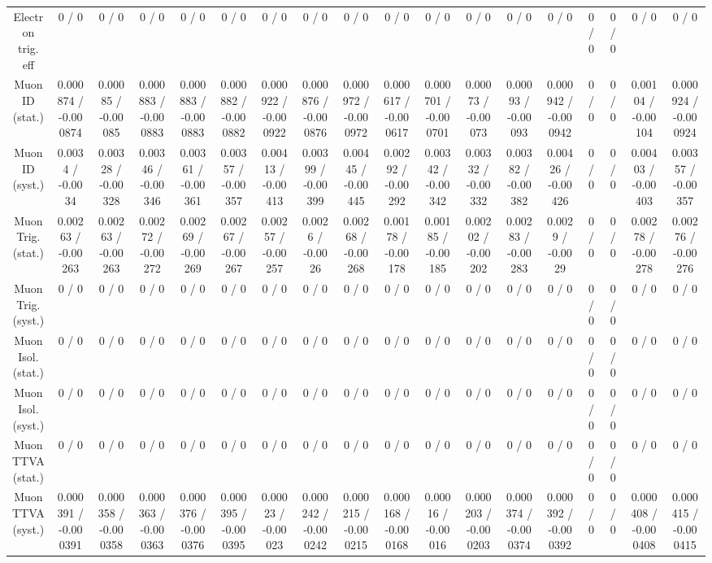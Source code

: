 \documentclass[10pt]{article}
\begin{document}
\begin{table}[htbp]
\begin{center}
\begin{tabular}{|c|c|c|c|c|c|c|c|c|c|c|c|c|c|c|c|c|c|}
  Electron trig. eff & 0 / 0 & 0 / 0 & 0 / 0 & 0 / 0 & 0 / 0 & 0 / 0 & 0 / 0 & 0 / 0 & 0 / 0 & 0 / 0 & 0 / 0 & 0 / 0 & 0 / 0 & 0 / 0 & 0 / 0 & 0 / 0 & 0 / 0 \\ 
  Muon ID (stat.) & 0.000874 / -0.000874 & 0.00085 / -0.00085 & 0.000883 / -0.000883 & 0.000883 / -0.000883 & 0.000882 / -0.000882 & 0.000922 / -0.000922 & 0.000876 / -0.000876 & 0.000972 / -0.000972 & 0.000617 / -0.000617 & 0.000701 / -0.000701 & 0.00073 / -0.00073 & 0.00093 / -0.00093 & 0.000942 / -0.000942 & 0 / 0 & 0 / 0 & 0.00104 / -0.00104 & 0.000924 / -0.000924 \\ 
  Muon ID (syst.) & 0.0034 / -0.0034 & 0.00328 / -0.00328 & 0.00346 / -0.00346 & 0.00361 / -0.00361 & 0.00357 / -0.00357 & 0.00413 / -0.00413 & 0.00399 / -0.00399 & 0.00445 / -0.00445 & 0.00292 / -0.00292 & 0.00342 / -0.00342 & 0.00332 / -0.00332 & 0.00382 / -0.00382 & 0.00426 / -0.00426 & 0 / 0 & 0 / 0 & 0.00403 / -0.00403 & 0.00357 / -0.00357 \\ 
  Muon Trig. (stat.) & 0.00263 / -0.00263 & 0.00263 / -0.00263 & 0.00272 / -0.00272 & 0.00269 / -0.00269 & 0.00267 / -0.00267 & 0.00257 / -0.00257 & 0.0026 / -0.0026 & 0.00268 / -0.00268 & 0.00178 / -0.00178 & 0.00185 / -0.00185 & 0.00202 / -0.00202 & 0.00283 / -0.00283 & 0.0029 / -0.0029 & 0 / 0 & 0 / 0 & 0.00278 / -0.00278 & 0.00276 / -0.00276 \\ 
  Muon Trig. (syst.) & 0 / 0 & 0 / 0 & 0 / 0 & 0 / 0 & 0 / 0 & 0 / 0 & 0 / 0 & 0 / 0 & 0 / 0 & 0 / 0 & 0 / 0 & 0 / 0 & 0 / 0 & 0 / 0 & 0 / 0 & 0 / 0 & 0 / 0 \\ 
  Muon Isol. (stat.) & 0 / 0 & 0 / 0 & 0 / 0 & 0 / 0 & 0 / 0 & 0 / 0 & 0 / 0 & 0 / 0 & 0 / 0 & 0 / 0 & 0 / 0 & 0 / 0 & 0 / 0 & 0 / 0 & 0 / 0 & 0 / 0 & 0 / 0 \\ 
  Muon Isol. (syst.) & 0 / 0 & 0 / 0 & 0 / 0 & 0 / 0 & 0 / 0 & 0 / 0 & 0 / 0 & 0 / 0 & 0 / 0 & 0 / 0 & 0 / 0 & 0 / 0 & 0 / 0 & 0 / 0 & 0 / 0 & 0 / 0 & 0 / 0 \\ 
  Muon TTVA (stat.) & 0 / 0 & 0 / 0 & 0 / 0 & 0 / 0 & 0 / 0 & 0 / 0 & 0 / 0 & 0 / 0 & 0 / 0 & 0 / 0 & 0 / 0 & 0 / 0 & 0 / 0 & 0 / 0 & 0 / 0 & 0 / 0 & 0 / 0 \\ 
  Muon TTVA (syst.) & 0.000391 / -0.000391 & 0.000358 / -0.000358 & 0.000363 / -0.000363 & 0.000376 / -0.000376 & 0.000395 / -0.000395 & 0.00023 / -0.00023 & 0.000242 / -0.000242 & 0.000215 / -0.000215 & 0.000168 / -0.000168 & 0.00016 / -0.00016 & 0.000203 / -0.000203 & 0.000374 / -0.000374 & 0.000392 / -0.000392 & 0 / 0 & 0 / 0 & 0.000408 / -0.000408 & 0.000415 / -0.000415 \\ 

\end{tabular}
\end{center}
\end{table}
\end{document}
